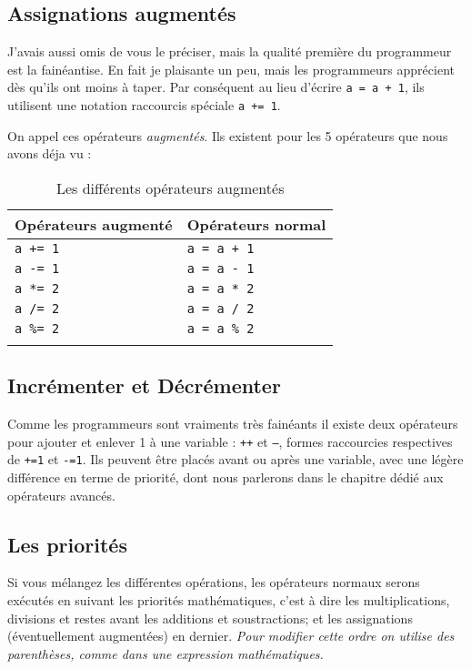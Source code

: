 \subsection{Assignations augmentés}
J'avais aussi omis de vous le préciser, mais la qualité première du programmeur est la fainéantise. En fait je plaisante un peu, mais les programmeurs apprécient dès qu'ils ont moins à taper.
Par conséquent au lieu d'écrire \texttt{a = a + 1},
ils utilisent une notation raccourcis spéciale \texttt{a += 1}.

On appel ces opérateurs \emph{augmentés}. Ils existent pour les 5 opérateurs que nous avons déja vu :

\begin{longtabu} to \linewidth {|X[,l,m]|X[,l,m]|}
\hline Opérateurs augmenté & Opérateurs normal \\ \hline
\endhead
\texttt{a += 1} & \texttt{a = a + 1} \\ \hline
\texttt{a -= 1} & \texttt{a = a - 1} \\ \hline
\texttt{a *= 2} & \texttt{a = a * 2} \\ \hline
\texttt{a /= 2} & \texttt{a = a / 2} \\ \hline
\texttt{a \%= 2} & \texttt{a = a \% 2} \\ \hline
\caption{Les différents opérateurs augmentés}
\end{longtabu}

\subsection{Incrémenter et Décrémenter}
Comme les programmeurs sont vraiments très fainéants il existe deux opérateurs pour ajouter et enlever 1 à une variable : \texttt{++} et \texttt{--}, formes raccourcies respectives de \texttt{+=1} et \texttt{-=1}. Ils peuvent être placés avant ou après une variable, avec une légère différence en terme de priorité, dont nous parlerons dans le chapitre dédié aux opérateurs avancés.
\subsection{Les priorités}
Si vous mélangez les différentes opérations, les opérateurs normaux serons exécutés en suivant les priorités mathématiques, c'est à dire les multiplications, divisions et restes avant les additions et soustractions; et les assignations (éventuellement augmentées) en dernier.
\emph{Pour modifier cette ordre on utilise des parenthèses, comme dans une expression mathématiques.}
